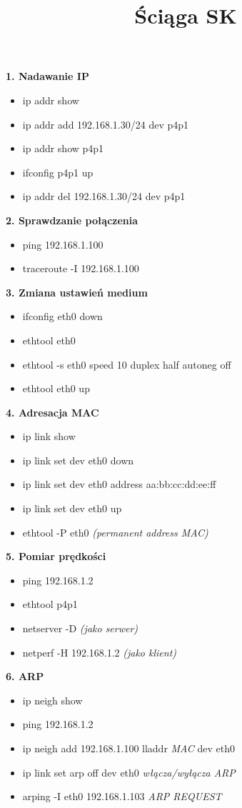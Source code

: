 \documentclass[8pt]{extarticle}
\title{Ściąga SK}
\begin{document}
\begin{multicols*}{3}
\textbf{1. Nadawanie IP}
\begin{itemize}
\item ip addr show
\item ip addr add 192.168.1.30/24 dev p4p1
\item ip addr show p4p1
\item ifconfig p4p1 up
\item ip addr del 192.168.1.30/24 dev p4p1
\end{itemize}

\textbf{2. Sprawdzanie połączenia}
\begin{itemize}
\item ping 192.168.1.100
\item traceroute -I 192.168.1.100
\end{itemize}

\textbf{3. Zmiana ustawień medium}
\begin{itemize}
\item ifconfig eth0 down
\item ethtool eth0
\item ethtool -s eth0 speed 10 duplex half autoneg off
\item ethtool eth0 up
\end{itemize}

\textbf{4. Adresacja MAC}
\begin{itemize}
\item ip link show
\item ip link set dev eth0 down
\item ip link set dev eth0 address aa:bb:cc:dd:ee:ff
\item ip link set dev eth0 up
\item ethtool -P eth0 \emph{(permanent address MAC)}
\end{itemize}

\textbf{5. Pomiar prędkości}
\begin{itemize}
\item ping 192.168.1.2
\item ethtool p4p1
\item netserver -D \emph{(jako serwer)}
\item netperf -H 192.168.1.2 \emph{(jako klient)}
\end{itemize}

\textbf{6. ARP}
\begin{itemize}
\item ip neigh show
\item ping 192.168.1.2
\item ip neigh add 192.168.1.100 lladdr \emph{MAC} dev eth0
\item ip link set arp off dev eth0 \emph{włącza/wyłącza ARP}
\item arping -I eth0 192.168.1.103 \emph{ARP REQUEST}
\end{itemize}


\end{multicols*}
\end{document}
